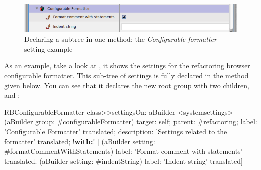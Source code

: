 \documentclass[a4paper,10pt,twoside]{book}
\begin{document}
\begin{figure}[tbh]
\begin{center}
\includegraphics[scale=0.47]{configurableFormatter}
\caption{Declaring a subtree in one method: the \textit{Configurable formatter} setting example}
\end{center}
\end{figure}
As an example, take a look at , it shows the settings for the refactoring browser configurable formatter. This sub-tree of settings is fully declared in the method  given below. You can see that it declares the new root group  with two children,  and :
\begin{code}{}
RBConfigurableFormatter class>>settingsOn: aBuilder
	<systemsettings>	
	(aBuilder group: #configurableFormatter)
		target: self;
		parent: #refactoring;
		label: 'Configurable Formatter' translated;
		description: 'Settings related to the formatter' translated;
		!\textbf{with:}! [
			(aBuilder setting: #formatCommentWithStatements)
				label: 'Format comment with statements' translated.
			(aBuilder setting: #indentString)
				label: 'Indent string' translated]
\end{code}
\end{document}
